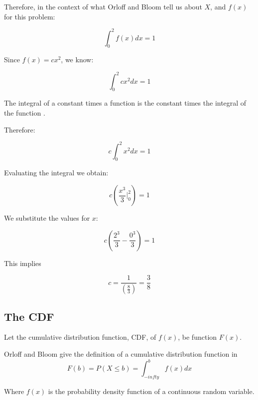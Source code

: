\documentclass[a4paper,11pt]{article}
\begin{document}
Therefore, in the context of what Orloff and Bloom tell us about $X$, and
$f \left(  x \right)$ for this problem:

\begin{equation}
  \int_{0}^{2} f \left( x \right) dx = 1
\end{equation}

Since $f \left( x \right) = cx^{2}$, we know:

\begin{equation}
  \int_{0}^{2}  cx^{2} dx = 1
\end{equation}

The integral of a constant times a function is the constant times the
integral of the function \cite{proofIntProps}.

Therefore:

\begin{equation}
  c \int_{0}^{2}  x^{2} dx = 1
\end{equation}

Evaluating the integral we obtain:

\begin{equation}
  c  \left( \frac{ x^{3}}{3}\bigg\rvert_{0}^{2} \right) = 1
\end{equation}

We substitute the values for $x$:

\begin{equation}
  c  \left( \frac{ 2^{3}}{3} - \frac{0^{3}}{3} \right) = 1
\end{equation}

This implies

\begin{equation}
  c  =  \frac{1}{\left( \frac{8}{3} \right)} = \frac{3}{8}
\end{equation}
\subsection{The CDF}

Let the cumulative distribution function, CDF, of $f\left( x \right)$, be
function $F\left(x\right)$.

Orloff and Bloom give the definition of a cumulative distribution function in
\cite{reading5b}
\begin{equation}
    F \left( b \right) = P \left( X \leq b \right)
      = \int_{-infty}^{b} f \left( x \right) dx
\end{equation}

Where $f\left( x \right)$ is the probability density function of a continuous
random variable.
\end{document}
